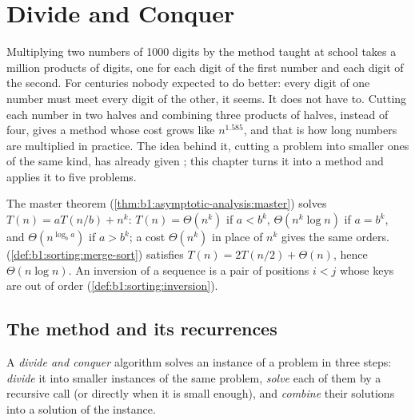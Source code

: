\chapter{Divide and Conquer}\label{ch:b1:divide-and-conquer}

Multiplying two numbers of 1000 digits by the method taught at school takes a million products of digits, one for
each digit of the first number and each digit of the second. For centuries nobody expected to do better: every digit
of one number must meet every digit of the other, it seems. It does not have to. Cutting each number in two halves and
combining three products of halves, instead of four, gives a method whose cost grows like $n^{1.585}$, and that is
how long numbers are multiplied in practice. The idea behind it, cutting a problem into smaller ones of the same kind,
has already given ; this chapter turns it into a method and applies it to five problems.

\begin{recall}
The master theorem (\cref{thm:b1:asymptotic-analysis:master}) solves $T(n) = aT(n/b) + n^k$: $T(n) =
\Theta(n^k)$ if $a < b^k$, $\Theta(n^k \log n)$ if $a = b^k$, and $\Theta(n^{\log_b a})$ if $a > b^k$; a cost
$\Theta(n^k)$ in place of $n^k$ gives the same orders.  (\cref{def:b1:sorting:merge-sort}) satisfies $T(n) = 2T(n/2) + \Theta(n)$, hence $\Theta(n
\log n)$. An inversion of a sequence is a pair of positions $i < j$ whose keys are out of order
(\cref{def:b1:sorting:inversion}).
\end{recall}

\section{The method and its recurrences}\label{sec:b1:divide-and-conquer:method}

\begin{definition}\label{def:b1:divide-and-conquer:dc}
A \emph{divide and conquer} algorithm solves an instance of a problem in three steps:
\emph{divide} it into smaller instances of the same problem, \emph{solve} each of them by a recursive call (or directly
when it is small enough), and \emph{combine} their solutions into a solution of the instance.
\end{definition}


